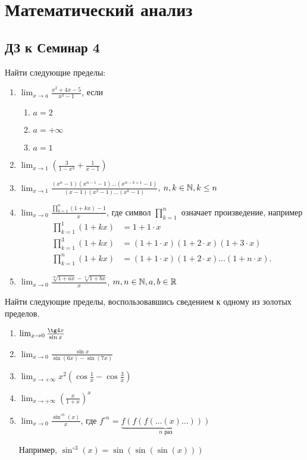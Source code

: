 \documentclass[a4paper]{article}
\begin{document}
    \section*{Математический анализ}
    \subsection*{ДЗ к Семинар 4}

    Найти следующие пределы:
    \begin{enumerate}
    \item
        $\lim_{x \to a} \frac{x^2 + 4x - 5}{x^2 - 1}$, если
        \begin{enumerate}
        \item $a = 2$
        \item $a = +\infty$
        \item $a = 1$
        \end{enumerate}
    \item
        $\lim_{x \to 1} \left(\frac{3}{1 - x^3} + \frac{1}{x - 1}\right)$
    \item
        $\lim_{x \to 1} \frac{(x^n - 1)(x^{n - 1} - 1)\dots(x^{n - k + 1} - 1)}{(x - 1)(x^2 - 1)\dots(x^{k} - 1)}$, $n, k \in \mathbb{N}, k \leq n$
    \item
        $\lim_{x \to 0} \frac{\prod_{k = 1}^n (1 + kx) - 1}{x}$, где символ $\prod_{k = 1}^n$ означает произведение, например
        \begin{align*}
            \prod_{k = 1}^1 (1 + kx) &= 1 + 1 \cdot x \\
            \prod_{k = 1}^3 (1 + kx) &= (1 + 1 \cdot x)(1 + 2 \cdot x)(1 + 3 \cdot x) \\
            \prod_{k = 1}^n (1 + kx) &= (1 + 1 \cdot x)(1 + 2 \cdot x) \dots (1 + n \cdot x)
        .\end{align*}
    \item
        $\lim_{x \to 0} \frac{\sqrt[m]{1 + ax} - \sqrt[n]{1 + bx}}{x}$, $m, n \in \mathbb{N}, a, b \in \mathbb{R}$
    \end{enumerate}

    Найти следующие пределы, воспользовавшись сведением к одному из золотых пределов.

    \begin{enumerate}[resume*]
    \item $\lim_{x \to 0} \frac{\tg 4x}{\sin x}$
    \item $\lim_{x \to 0} \frac{\sin x}{\sin(6x) - \sin(7x)}$
    \item $\lim_{x \to +\infty} x^2\left(\cos \frac{1}{x} - \cos \frac{3}{x}\right)$
    \item $\lim_{x \to +\infty} \left(\frac{x}{1 + x}\right)^{x}$
    \item $\lim_{x \to 0} \frac{\sin^{\circ n}(x)}{x}$, где $f^{\circ n} = \underbrace{f(f(f(\dots(x)\dots)))}_{n \text{ раз}}$

        Например, $\sin^{\circ 3} (x) = \sin(\sin(\sin(x)))$
    \end{enumerate}
\end{document}

